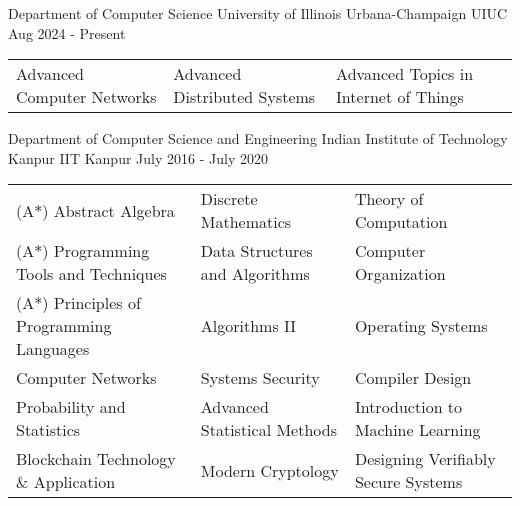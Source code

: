 

\begin{cventries}

\extraentry
  {Department of Computer Science}
  {University of Illinois Urbana-Champaign}
  {UIUC}
  {Aug 2024 - Present}
{\vspace*{-\baselineskip}\vspace*{-\baselineskip}\fontsize{9.5pt}{1.5em}\bodyfontlight\upshape\color{text}
  \setlength\extrarowheight{-3pt}
  \begin{tabular*}{\textwidth}{L{\textwidth/3} L{\textwidth/3} L{\textwidth/3}}
    Advanced Computer Networks & Advanced Distributed Systems & Advanced Topics in Internet of Things \\
\end{tabular*}}


\extraentry
  {Department of Computer Science and Engineering}
  {Indian Institute of Technology Kanpur}
  {IIT Kanpur}
  {July 2016 - July 2020}
{\vspace*{-\baselineskip}\fontsize{9.5pt}{1.5em}\bodyfontlight\upshape\color{text}
  \setlength\extrarowheight{-3pt}
  \begin{tabular*}{\textwidth}{L{\textwidth/3} L{\textwidth/3} L{\textwidth/3}}
    (A$*$) Abstract Algebra & Discrete Mathematics & Theory of Computation \\
    (A$*$) Programming Tools and Techniques & Data Structures and Algorithms & Computer Organization \\
    (A$*$) Principles of Programming Languages & Algorithms II & Operating Systems \\
    Computer Networks & Systems Security & Compiler Design \\
    Probability and Statistics & Advanced Statistical Methods & Introduction to Machine Learning \\
    Blockchain Technology \& Application & Modern Cryptology & Designing Verifiably Secure Systems \\ %
\end{tabular*}}

\end{cventries}

